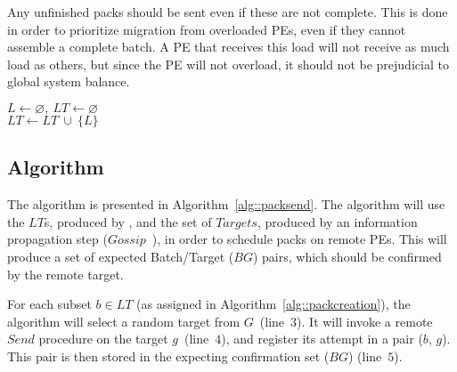 Any unfinished packs should be sent even if these are not complete.
This is done in order to prioritize migration from overloaded PEs, even if they cannot assemble a complete batch.
A PE that receives this load will not receive as much load as others, but since the PE will not overload, it should not be prejudicial to global system balance.

\begin{algorithm}[b]
    \DontPrintSemicolon
    $L \gets \varnothing,\ LT \gets \varnothing$ \\
    $LT \gets LT\ \cup\ \{L\}$   
    \caption{\batchassembly} 
    \label{alg::packcreation}
\end{algorithm}

\subsection{\batchsend Algorithm} \label{sec:algo:sending}

The \batchsend algorithm is presented in Algorithm~\ref{alg::packsend}.
The algorithm will use the $LT$s, produced by \batchassembly, and the set of $Targets$, produced by an information propagation step ($Gossip$~\cite{gossip}), in order to schedule packs on remote PEs.
This will produce a set of expected Batch/Target ($BG$) pairs, which should be confirmed by the remote target.

For each subset $b \in LT$ (as assigned in Algorithm~\ref{alg::packcreation}), the algorithm will select a random target from $G$~(line~$3$).
It will invoke a remote $Send$ procedure on the target $g$~(line~$4$), and register its attempt in a pair ($b$, $g$).
This pair is then stored in the expecting confirmation set ($BG$) (line~$5$).

